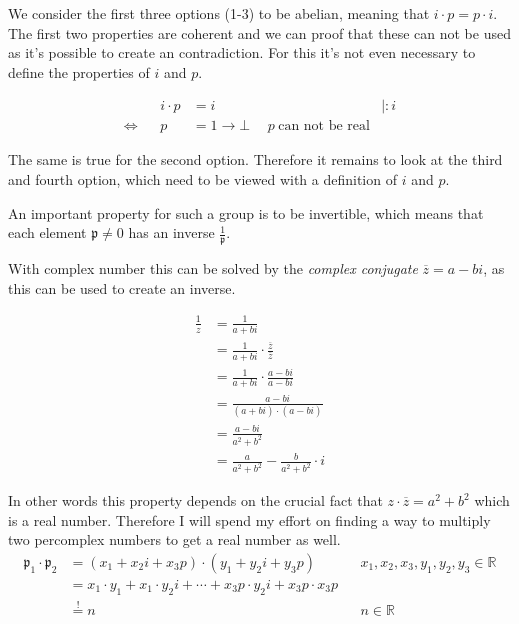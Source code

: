 \documentclass[a4paper,english,parskip]{scrartcl}
\begin{document}
We consider the first three options (1-3) to be abelian, meaning that $i \cdot p = p \cdot i$. \\
The first two properties are coherent and we can proof that these can not be used as it's possible to create an contradiction. 
For this it's not even necessary to define the properties of $i$ and $p$.

\begin{align*}
&& i \cdot p &= i  & | : i \\
\iff && p &= 1 \rightarrow \bot  \hspace{15pt} p \hspace{3pt} \text{can not be real}
\end{align*}

The same is true for the second option.
Therefore it remains to look at the third and fourth option, 
which need to be viewed with a definition of $i$ and $p$.


An important property for such a group is to be invertible, which means
that each element $\mathfrak{p} \neq 0$ has an inverse $\frac{1}{\mathfrak{p}}$.

With complex number this can be solved by the \textit{complex conjugate} $\overline{z} = a - bi$,
as this can be used to create an inverse.

\begin{align*}
\frac{1}{z} &= \frac{1}{a + bi} \\
&= \frac{1}{a + bi} \cdot \frac{\overline{z}}{\overline{z}} \\
&= \frac{1}{a + bi} \cdot \frac{a - bi}{a - bi} \\
&= \frac{a - bi}{(a + bi) \cdot (a - bi)} \\
&= \frac{a - bi}{a^2 + b^2} \\
&= \frac{a}{a^2 + b^2} - \frac{b}{a^2 + b^2} \cdot i
\end{align*}

In other words this property depends on the crucial fact that $z \cdot \overline{z} = a^2 + b^2$ which is a real number.
Therefore I will spend my effort on finding a way to multiply two percomplex numbers to get a real number as well. 
\begin{align*}
\mathfrak{p}_1 \cdot \mathfrak{p}_2 &= (x_1 + x_2i +x_3p) \cdot (y_1 + y_2i + y_3p) && x_1,x_2,x_3, y_1,y_2,y_3 \in \mathbb{R} \\
&= x_1 \cdot y_1 + x_1 \cdot y_2i + \cdots + x_3p \cdot y_2i + x_3p \cdot x_3p  \\
&\stackrel{!}{=} n &&  n \in \mathbb{R}
\end{align*}
\end{document}
